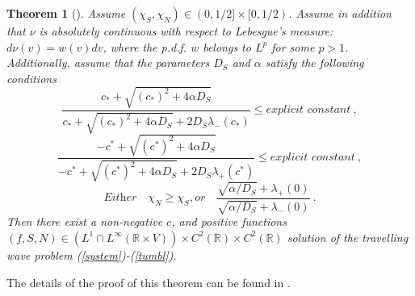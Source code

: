 \documentclass[11pt,twoside]{article}
\newtheorem{theorem}{Theorem}%
\begin{document}
\begin{theorem}[\cite{calvez2016chemotactic}]
    Assume $(\chi_S,\chi_N)\in (0,1/2]\times [0,1/2)$. Assume in addition that  $\nu$ is absolutely continuous with respect to Lebesgue's measure: $d\nu(v)=w(v)dv$, where the p.d.f. $w$ belongs to $L^p$  for some $p>1$.
    Additionally, assume that the parameters $D_S$ and $\alpha$ satisfy the following conditions
    \begin{equation}\label{1.cond}
\frac{c_*+ \sqrt{(c_*)^2+4\alpha D_S}}{c_*+\sqrt{(c_*)^2+4\alpha D_S}+2D_S\lambda_-(c_*)}\leq \textit{explicit constant}\ ,
\end{equation}
\begin{equation}\label{2.cond}
\frac{-c^*+ \sqrt{(c^*)^2+4\alpha D_S}}{-c^*+\sqrt{(c^*)^2+4\alpha D_S}+2D_S\lambda_+(c^*)}\leq \textit{explicit constant}\ ,
\end{equation}
\begin{equation}\label{3.cond}
\textit{Either}\quad \chi_N \geq \chi_S, \textit{or} \quad \frac{\sqrt{\alpha/D_S}+\lambda_+(0)}{\sqrt{\alpha/D_S}+\lambda_-(0)}\ .
\end{equation}
Then there exist a non-negative $c$, and positive functions $(f, S, N)\in (L^1\cap L^\infty (\mathbb{R}\times V))\times C^2(\mathbb{R})\times C^2(\mathbb{R})$ solution of the travelling wave problem (\ref{system})-(\ref{tumbl}).
\end{theorem}

The details of the proof of this theorem can be found in \cite{calvez2016chemotactic}.
\end{document}

